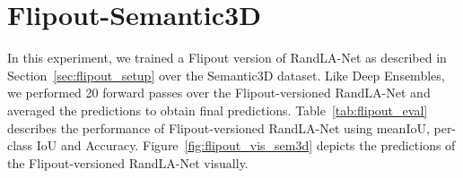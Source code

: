     \section{Flipout-Semantic3D}
    In this experiment, we trained a Flipout version of RandLA-Net as described in Section~\ref{sec:flipout_setup} over the Semantic3D dataset.
    Like Deep Ensembles, we performed 20 forward passes over the Flipout-versioned RandLA-Net and averaged the predictions to obtain final predictions.
    Table~\ref{tab:flipout_eval} describes the performance of Flipout-versioned RandLA-Net using meanIoU, per-class IoU and Accuracy.
    Figure~\ref{fig:flipout_vis_sem3d} depicts the predictions of the Flipout-versioned RandLA-Net visually.
    \begin{table}[h!]
        \caption{Illustration of performance of Flipout-versioned RandLA-Net on Semantic3D dataset. meanIOU, IOU per-class and overall accuracy are represented here.
        C1 to C8 are the classes of Semantic3D which are Manmade terrain, Natural terrain, High vegetation, Low vegetation, Buildings, Hardscapes, Scanning artifacts, and Cars.}
        \label{tab:flipout_eval}
    \end{table}
